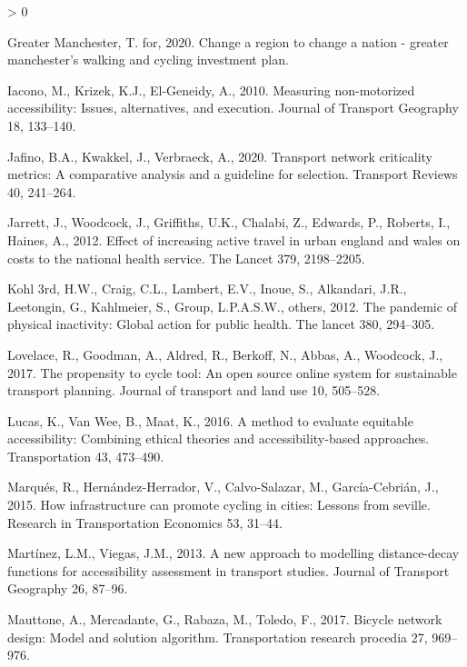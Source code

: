 \documentclass[
]{article}
\newlength{\cslhangindent}
\newenvironment{CSLReferences}[2] %
 {%
  \setlength{\parindent}{0pt}
  \ifodd #1 \everypar{\setlength{\hangindent}{\cslhangindent}}\ignorespaces\fi
  \ifnum #2 > 0
  \setlength{\parskip}{#2\baselineskip}
  \fi
 }%
 {}
\begin{document}
\begin{CSLReferences}{1}{0}
\leavevmode\hypertarget{ref-manchestercyclingbee2020}{}%
Greater Manchester, T. for, 2020. Change a region to change a nation - greater manchester's walking and cycling investment plan.

\leavevmode\hypertarget{ref-iacono2010measuring}{}%
Iacono, M., Krizek, K.J., El-Geneidy, A., 2010. Measuring non-motorized accessibility: Issues, alternatives, and execution. Journal of Transport Geography 18, 133--140.

\leavevmode\hypertarget{ref-jafino2020transport}{}%
Jafino, B.A., Kwakkel, J., Verbraeck, A., 2020. Transport network criticality metrics: A comparative analysis and a guideline for selection. Transport Reviews 40, 241--264.

\leavevmode\hypertarget{ref-jarrett2012effect}{}%
Jarrett, J., Woodcock, J., Griffiths, U.K., Chalabi, Z., Edwards, P., Roberts, I., Haines, A., 2012. Effect of increasing active travel in urban england and wales on costs to the national health service. The Lancet 379, 2198--2205.

\leavevmode\hypertarget{ref-kohl2012pandemic}{}%
Kohl 3rd, H.W., Craig, C.L., Lambert, E.V., Inoue, S., Alkandari, J.R., Leetongin, G., Kahlmeier, S., Group, L.P.A.S.W., others, 2012. The pandemic of physical inactivity: Global action for public health. The lancet 380, 294--305.

\leavevmode\hypertarget{ref-lovelace2017propensity}{}%
Lovelace, R., Goodman, A., Aldred, R., Berkoff, N., Abbas, A., Woodcock, J., 2017. The propensity to cycle tool: An open source online system for sustainable transport planning. Journal of transport and land use 10, 505--528.

\leavevmode\hypertarget{ref-lucas2016method}{}%
Lucas, K., Van Wee, B., Maat, K., 2016. A method to evaluate equitable accessibility: Combining ethical theories and accessibility-based approaches. Transportation 43, 473--490.

\leavevmode\hypertarget{ref-marques2015infrastructure}{}%
Marqués, R., Hernández-Herrador, V., Calvo-Salazar, M., García-Cebrián, J., 2015. How infrastructure can promote cycling in cities: Lessons from seville. Research in Transportation Economics 53, 31--44.

\leavevmode\hypertarget{ref-martinez2013new}{}%
Martínez, L.M., Viegas, J.M., 2013. A new approach to modelling distance-decay functions for accessibility assessment in transport studies. Journal of Transport Geography 26, 87--96.

\leavevmode\hypertarget{ref-mauttone2017bicycle}{}%
Mauttone, A., Mercadante, G., Rabaza, M., Toledo, F., 2017. Bicycle network design: Model and solution algorithm. Transportation research procedia 27, 969--976.


\end{CSLReferences}
\end{document}
